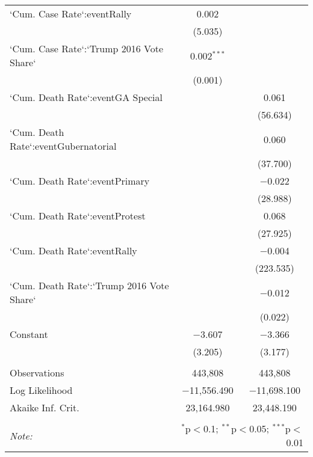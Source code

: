 \begin{table}[!htbp]
\begin{tabular}{@{\extracolsep{5pt}}lcc}
  `Cum. Case Rate`:eventRally & 0.002 &  \\ 
  & (5.035) &  \\ 
  `Cum. Case Rate`:`Trump 2016 Vote Share` & 0.002$^{***}$ &  \\ 
  & (0.001) &  \\ 
  `Cum. Death Rate`:eventGA Special &  & 0.061 \\ 
  &  & (56.634) \\ 
  `Cum. Death Rate`:eventGubernatorial &  & 0.060 \\ 
  &  & (37.700) \\ 
  `Cum. Death Rate`:eventPrimary &  & $-$0.022 \\ 
  &  & (28.988) \\ 
  `Cum. Death Rate`:eventProtest &  & 0.068 \\ 
  &  & (27.925) \\ 
  `Cum. Death Rate`:eventRally &  & $-$0.004 \\ 
  &  & (223.535) \\ 
  `Cum. Death Rate`:`Trump 2016 Vote Share` &  & $-$0.012 \\ 
  &  & (0.022) \\ 
  Constant & $-$3.607 & $-$3.366 \\ 
  & (3.205) & (3.177) \\ 
 \hline \\[-1.8ex] 
Observations & 443,808 & 443,808 \\ 
Log Likelihood & $-$11,556.490 & $-$11,698.100 \\ 
Akaike Inf. Crit. & 23,164.980 & 23,448.190 \\ 
\hline 
\hline \\[-1.8ex] 
\textit{Note:}  & \multicolumn{2}{r}{$^{*}$p$<$0.1; $^{**}$p$<$0.05; $^{***}$p$<$0.01} \\ 
\end{tabular} 
\end{table} 
